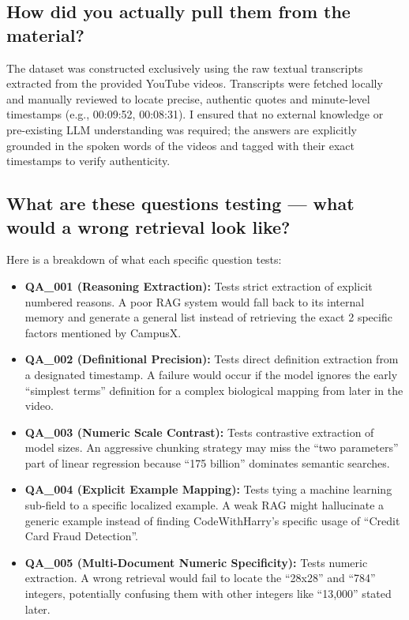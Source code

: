 \documentclass[12pt,a4paper]{article}
\begin{document}
\subsection*{How did you actually pull them from the material?}
The dataset was constructed exclusively using the raw textual transcripts extracted from the provided YouTube videos. Transcripts were fetched locally and manually reviewed to locate precise, authentic quotes and minute-level timestamps (e.g., 00:09:52, 00:08:31). I ensured that no external knowledge or pre-existing LLM understanding was required; the answers are explicitly grounded in the spoken words of the videos and tagged with their exact timestamps to verify authenticity.

\subsection*{What are these questions testing — what would a wrong retrieval look like?}
Here is a breakdown of what each specific question tests:
\begin{itemize}
    \item \textbf{QA\_001 (Reasoning Extraction):} Tests strict extraction of explicit numbered reasons. A poor RAG system would fall back to its internal memory and generate a general list instead of retrieving the exact 2 specific factors mentioned by CampusX.
    \item \textbf{QA\_002 (Definitional Precision):} Tests direct definition extraction from a designated timestamp. A failure would occur if the model ignores the early ``simplest terms'' definition for a complex biological mapping from later in the video.
    \item \textbf{QA\_003 (Numeric Scale Contrast):} Tests contrastive extraction of model sizes. An aggressive chunking strategy may miss the ``two parameters'' part of linear regression because ``175 billion'' dominates semantic searches.
    \item \textbf{QA\_004 (Explicit Example Mapping):} Tests tying a machine learning sub-field to a specific localized example. A weak RAG might hallucinate a generic example instead of finding CodeWithHarry's specific usage of ``Credit Card Fraud Detection''.
    \item \textbf{QA\_005 (Multi-Document Numeric Specificity):} Tests numeric extraction. A wrong retrieval would fail to locate the ``28x28'' and ``784'' integers, potentially confusing them with other integers like ``13,000'' stated later.
\end{itemize}
\end{document}
